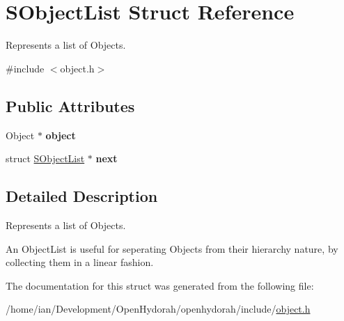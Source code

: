 \hypertarget{structSObjectList}{\section{S\-Object\-List Struct Reference}
\label{structSObjectList}
}


Represents a list of Objects.  




{\ttfamily \#include $<$object.\-h$>$}

\subsection*{Public Attributes}
\begin{DoxyCompactItemize}
\item 
\hypertarget{structSObjectList_a59fd199b67faa3b17c2b0a762be2a751}{Object $\ast$ {\bfseries object}}\label{structSObjectList_a59fd199b67faa3b17c2b0a762be2a751}

\item 
\hypertarget{structSObjectList_a326f93b4caf9244e102d7b7e1f5021c9}{struct \hyperlink{structSObjectList}{S\-Object\-List} $\ast$ {\bfseries next}}\label{structSObjectList_a326f93b4caf9244e102d7b7e1f5021c9}

\end{DoxyCompactItemize}


\subsection{Detailed Description}
Represents a list of Objects. 

An Object\-List is useful for seperating Objects from their hierarchy nature, by collecting them in a linear fashion. 

The documentation for this struct was generated from the following file\-:\begin{DoxyCompactItemize}
\item 
/home/ian/\-Development/\-Open\-Hydorah/openhydorah/include/\hyperlink{object_8h}{object.\-h}\end{DoxyCompactItemize}
